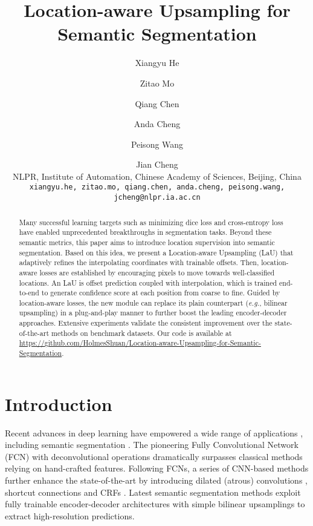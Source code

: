 \documentclass[10pt,twocolumn,letterpaper]{article}
\begin{document}
\title{Location-aware Upsampling for Semantic Segmentation}

\author{Xiangyu He\and Zitao Mo\and Qiang Chen\and Anda Cheng\and Peisong Wang\and Jian Cheng\\
NLPR, Institute of Automation, Chinese Academy of Sciences, Beijing, China\\
{\tt\small {xiangyu.he, zitao.mo, qiang.chen, anda.cheng, peisong.wang, jcheng@nlpr.ia.ac.cn}}
}

\maketitle


\begin{abstract}
Many successful learning targets such as minimizing dice loss and cross-entropy loss have enabled unprecedented breakthroughs in segmentation tasks. Beyond these semantic metrics, this paper aims to introduce location supervision into semantic segmentation. Based on this idea, we present a Location-aware Upsampling (LaU) that adaptively refines the interpolating coordinates with trainable offsets. Then, location-aware losses are established by encouraging pixels to move towards well-classified locations. An LaU is offset prediction coupled with interpolation, which is trained end-to-end to generate confidence score at each position from coarse to fine. Guided by location-aware losses, the new module can replace its plain counterpart (\textit{e.g.}, bilinear upsampling) in a plug-and-play manner to further boost the leading encoder-decoder approaches. Extensive experiments validate the consistent improvement over the state-of-the-art methods on benchmark datasets. Our code is available at \href{https://github.com/HolmesShuan/Location-aware-Upsampling-for-Semantic-Segmentation}{https://github.com/HolmesShuan/Location-aware-Upsampling-for-Semantic-Segmentation}.
\end{abstract}

\section{Introduction}
Recent advances in deep learning have empowered a wide range of applications \cite{KrizhevskySH12, RenHGS15, resnet, ToshevS14, DongLHT16}, including semantic segmentation \cite{ZhaoSQWJ17, YuK15, LongSD15, ChenPKMY18}. The pioneering Fully Convolutional Network (FCN) \cite{LongSD15} with deconvolutional operations \cite{RonnebergerFB15} dramatically surpasses classical methods relying on hand-crafted features. Following FCNs, a series of CNN-based methods further enhance the state-of-the-art by introducing dilated (atrous) convolutions \cite{YuK15, ASPP}, shortcut connections \cite{BadrinarayananK17} and CRFs  \cite{VemulapalliT0C16, BertasiusTYS17, LinSHR16}. Latest semantic segmentation methods \cite{EncNet, deeplabv3} exploit fully trainable encoder-decoder architectures with simple bilinear upsamplings to extract high-resolution predictions.
\end{document}
